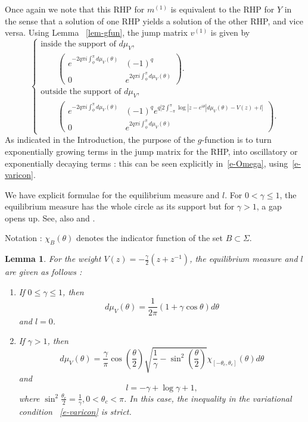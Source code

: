 \documentclass{amsart}
\newtheorem{lem}[thm]{Lemma}
\theoremstyle{definition}
\theoremstyle{remark}
\numberwithin{equation}{section}
\begin{document}
Once again we note that this RHP for $m^{(1)}$ is equivalent to 
the RHP for $Y$ in the sense that 
a solution of one RHP yields a solution of the other RHP, and vice versa.
Using Lemma ~\ref{lem-gfun}, the jump matrix $v^{(1)}$ is given by 
\begin{equation}\label{e-Omega}
  \begin{cases}
    \text{inside the support of $d\mu_V$},\\
    \qquad\begin{pmatrix} e^{-2q\pi i\int_{\phi}^{\pi} d\mu_V(\theta)}& (-1)^q\\
          0& e^{2q\pi i\int_{\phi}^{\pi} d\mu_V(\theta)} \end{pmatrix}.\\
    \text{outside the support of $d\mu_V$}, \\
    \qquad\begin{pmatrix} e^{-2q\pi i\int_{\phi}^{\pi} d\mu_V(\theta)}& 
(-1)^qe^{q\bigl[ 2\int_{-\pi}^{\pi}\log |z-e^{i\theta}| d\mu_V(\theta) 
-V(z)+l\bigr] }\\
0&e^{2q\pi i\int_{\phi}^{\pi} d\mu_V(\theta)} \end{pmatrix}.
  \end{cases}
\end{equation}
As indicated in the Introduction, the purpose of the $g$-function is to 
turn exponentially growing terms in the jump matrix for the RHP,  
into oscillatory or exponentially decaying terms : this can be seen 
explicitly in~\eqref{e-Omega}, using~\eqref{e-varicon}.


\bigskip
We have explicit formulae for the equilibrium measure and $l$.
For $0<\gamma\leq 1$, the equilibrium measure has the whole circle 
as its support but for $\gamma > 1$, a gap opens up. 
See, also \cite{GW} and \cite{Johan}.

Notation : $\chi_B(\theta)$ denotes the indicator function of the set 
$B\subset\Sigma$.

\begin{lem}\label{lem-ourg}
For the weight $V(z)=-\frac{\gamma}{2}(z+z^{-1})$, the equilibrium measure and $l$ are given as follows : 
\begin{enumerate}
\item If $0\leq \gamma \leq 1$, then
\begin{equation}\label{e-lem4.3.1} 
  d\mu_V(\theta)=\frac{1}{2\pi}(1+\gamma \cos{\theta}) d\theta
\end{equation}
and $l=0$.
\item If $\gamma > 1$, then
\begin{equation}\label{e-lem4.3.2}
  d\mu_V(\theta)=\frac{\gamma}{\pi} \cos(\frac{\theta}{2})
      \sqrt{\frac{1}{\gamma} - \sin^2(\frac{\theta}{2})} 
\chi_{[-\theta_c, \theta_c]}(\theta) d\theta
\end{equation}
and 
\begin{equation}\label{e-lem4.3.3}
  l=-\gamma +\log\gamma +1,
\end{equation}
      where $\sin^2\frac{\theta_c}{2}=\frac{1}{\gamma}, 0< \theta_c<\pi$. 
In this case, the inequality in the variational 
condition ~\eqref{e-varicon} is strict.
\end{enumerate}
\end{lem}
\end{document}
